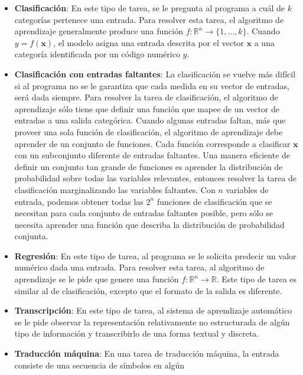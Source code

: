 \begin{itemize}
    \item \textbf{Clasificación}: En este tipo de tarea, se le pregunta al programa a cuál
    de $k$ categorías pertenece una entrada. Para resolver esta tarea, el
    algoritmo de aprendizaje generalmente produce una
    función $f : \mathbb{R}^n \rightarrow \{1, \dots, k\}$. Cuando $y = f(\mathbf{x})$, el
    modelo asigna una entrada descrita por el vector $\mathbf{x}$ a una categoría
    identificada por un código numérico $y$.
    \item \textbf{Clasificación con entradas faltantes}: La clasificación se vuelve más difícil si al programa no se le garantiza que cada medida en su vector de entradas,
    será dada siempre. Para resolver la tarea de clasificación, el
    algoritmo de aprendizaje sólo tiene que definir una función que mapee de
    un vector de entradas a una salida categórica. Cuando algunas entradas
    faltan, más que proveer una sola función de clasificación, el algoritmo
    de aprendizaje debe aprender de un conjunto de funciones. Cada función
    corresponde a clasificar $\mathbf{x}$ con un subconjunto diferente de entradas
    faltantes. Una manera eficiente de definir un conjunto
    tan grande de funciones es aprender la distribución de probabilidad
    sobre todas las variables relevantes, entonces resolver la tarea de
    clasificación marginalizando las variables faltantes. Con $n$ variables de
    entrada, podemos obtener todas las $2^n$ funciones de clasificación que
    se necesitan para cada conjunto de entradas faltantes posible, pero sólo
    se necesita aprender una función que describa la distribución de
    probabilidad conjunta.
    \item \textbf{Regresión}: En este tipo de tarea, al programa se le solicita predecir un valor numérico dada una entrada.
    Para resolver esta tarea, al algoritmo de aprendizaje se le pide que
    genere una función $f: \mathbb{R}^n \rightarrow \mathbb{R}$. Este tipo de tarea es
    similar al de clasificación, excepto que el formato de la salida es
    diferente. 
    \item \textbf{Transcripción}: En este tipo de
    tarea, al sistema de aprendizaje automático se le pide observar la
    representación relativamente no estructurada de algún tipo de
    información y transcribirlo de una forma textual y discreta.
    \item \textbf{Traducción máquina}: En una tarea de traducción
    máquina, la entrada consiste de una secuencia de símbolos en algún

\end{itemize}
